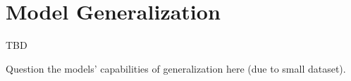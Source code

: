\section{Model Generalization}
\label{chp:threats_to_validity:sec:model_generalization}
TBD

Question the models' capabilities of generalization here (due to small dataset).
